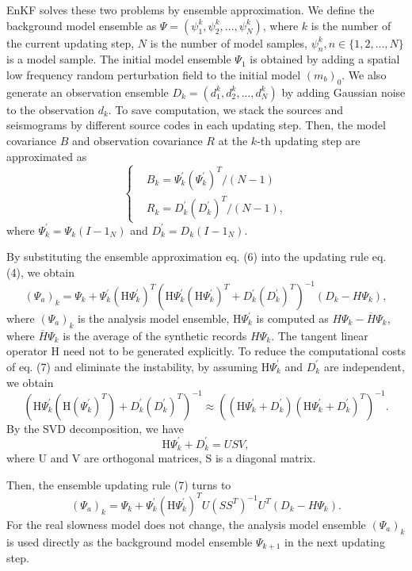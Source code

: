 \documentclass[mreferee]{gji}
\begin{document}
EnKF solves these two problems by ensemble approximation. We define the background model ensemble as $\Psi=(\psi_1^k,\psi_2^k,...,\psi_N^k)$, where $k$ is the number of the current updating step, $N$ is the number of model samples, $\psi_n^k, n\in\{1,2,...,N\}$ is a model sample. The initial model ensemble $\Psi_1$ is obtained by adding a spatial low frequency random perturbation field to the initial model $(m_b)_0$. We also generate an observation ensemble $D_k=(d_1^k,d_2^k,...,d_N^k)$ by adding Gaussian noise to the observation $d_k$. To save computation, we stack the sources and seismograms by different source codes in each updating step. Then, the model covariance $B$ and observation covariance $R$ at the $k$-th updating step are approximated as
\begin{equation}
\left\{ 
\begin{aligned}
& B_k=\Psi_k^{'}(\Psi_k^{'})^T/(N-1) \\
& R_k=D_k^{'}(D_k^{'})^T/(N-1),
\end{aligned}
\right.
\end{equation}
where $\Psi_k^{'}=\Psi_k(I-1_N)$ and $D_k^{'}=D_k(I-1_N)$.

By substituting the ensemble approximation eq. (6) into the updating rule eq. (4), we obtain
\begin{equation}
(\Psi_a)_k=\Psi_k+\Psi_k^{'}(\mbox{H}\Psi_k^{'})^T\left(\mbox{H}\Psi_k^{'}(\mbox{H}\Psi_k^{'})^T+D_k^{'}(D_k^{'})^T\right)^{-1}(D_k-H\Psi_k),
\end{equation}
where $(\Psi_a)_k$ is the analysis model ensemble, $\mbox{H}\Psi_k^{'}$ is computed as $H\Psi_k-\overline H\Psi_k$, where $\overline H\Psi_k$ is the average of the synthetic records $H\Psi_k$. The tangent linear operator H need not to be generated explicitly. To reduce the computational costs of eq. (7) and eliminate the instability, by assuming $\mbox{H}\Psi_k^{'}$ and $D_k^{'}$ are independent, we obtain
\begin{equation}
\left(\mbox{H}\Psi_k^{'}(\mbox{H}(\Psi_k^{'})^T)+D_k^{'}(D_k^{'})^T\right)^{-1}\approx\left((\mbox{H}\Psi_k^{'}+D_k^{'})(\mbox{H}\Psi_k^{'}+D_k^{'})^T\right)^{-1}.
\end{equation}
By the SVD decomposition, we have
\begin{equation}
\mbox{H}\Psi_k^{'}+D_k^{'}=USV,
\end{equation}
where U and V are orthogonal matrices, S is a diagonal matrix.

Then, the ensemble updating rule (7) turns to
\begin{equation}
(\Psi_a)_k=\Psi_k+\Psi_k^{'}(\mbox{H}\Psi_k^{'})^TU(SS^T)^{-1}U^T(D_k-H\Psi_k).
\end{equation}
For the real slowness model does not change, the analysis model ensemble $(\Psi_a)_k$ is used directly as the background model ensemble $\Psi_{k+1}$ in the next updating step.
\end{document}
